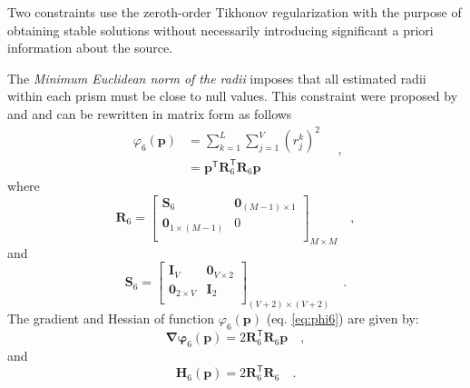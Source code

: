 Two constraints use the zeroth-order Tikhonov regularization with the purpose of obtaining stable solutions without necessarily introducing significant a priori information about the source. 

The \textit{Minimum Euclidean norm of the radii} imposes that 
all estimated radii within each prism must be close to null values. This constraint were proposed by \cite{oliveirajr-etal2011} and \cite{oliveirajr-barbosa2013} and can be rewritten in matrix form as follows
\begin{equation}\label{eq:phi6}
\begin{split}
\varphi_{6}(\mathbf{p}) &= \sum\limits^{L}_{k=1}\sum\limits^{V}_{j=1}\left(r_{j}^{k}\right)^2 \\
&= \mathbf{p}^{\mathsf{T}} \mathbf{R}_{6}^{\mathsf{T}} \mathbf{R}_{6} \mathbf{p}
\end{split} \quad ,
\end{equation}
where
\begin{equation}
\mathbf{R}_{6} = 
\begin{bmatrix}
\mathbf{S}_{6} & \mathbf{0}_{(M-1) \times 1} \\
\mathbf{0}_{1 \times (M-1)} & 0 \\
\end{bmatrix}_{M\times M} \quad ,
\label{eq:R6-matrix}
\end{equation}
and 
\begin{equation}
\mathbf{S}_{6} = 
\begin{bmatrix}
\mathbf{I}_{V} & \mathbf{0}_{V \times 2} \\
\mathbf{0}_{2 \times V} & \mathbf{I}_{2} \\
\end{bmatrix}_{ (V+2)\times (V+2)} \quad .
\label{eq:S6-matrix}
\end{equation}
The gradient and Hessian of function $\varphi_{6}(\mathbf{p})$ (eq. \ref{eq:phi6}) are given by:
\begin{equation}\label{eq:phi6_grad}
\boldsymbol{\nabla\varphi}_{6}(\mathbf{p}) = 2 \mathbf{R}_{6}^{\mathsf{T}} \mathbf{R}_{6} \mathbf{p} \quad ,
\end{equation}
and
\begin{equation}\label{eq:phi6_hessian}
\mathbf{H}_{6}(\mathbf{p}) = 2 \mathbf{R}^{\mathsf{T}}_{6}\mathbf{R}_{6} \quad .
\end{equation}

